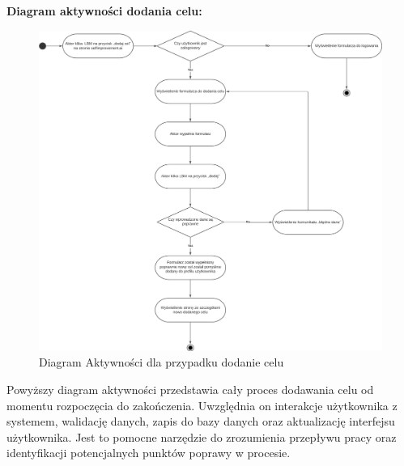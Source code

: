 {\noindent \bf Diagram aktywności dodania celu: }
\begin{figure}[H]
    \centering
    \includegraphics[width=1\textwidth]{Obrazy/diagrams/add_goal_activity_diagram.png}
    \caption{Diagram Aktywności dla przypadku dodanie celu}
    \label{fig:my_label}
\end{figure}

\noindent Powyższy diagram aktywności przedstawia cały proces dodawania celu od momentu rozpoczęcia do zakończenia. Uwzględnia on interakcje użytkownika z systemem, walidację danych, zapis do bazy danych oraz aktualizację interfejsu użytkownika. Jest to pomocne narzędzie do zrozumienia przepływu pracy oraz identyfikacji potencjalnych punktów poprawy w procesie.

\clearpage

